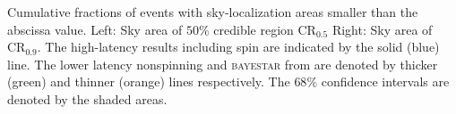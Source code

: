 Cumulative fractions of events with sky-localization areas smaller than the abscissa value. Left: Sky area of $50\%$ credible region $\mathrm{CR}_{0.5}$ Right: Sky area of $\mathrm{CR}_{0.9}$. The high-latency results including spin are indicated by the solid (blue) line. The lower latency nonspinning and \textsc{bayestar} from \citet{Singer_2014} are denoted by thicker (green) and thinner (orange) lines respectively. The $68\%$ confidence intervals are denoted by the shaded areas.\label{fig:sky}